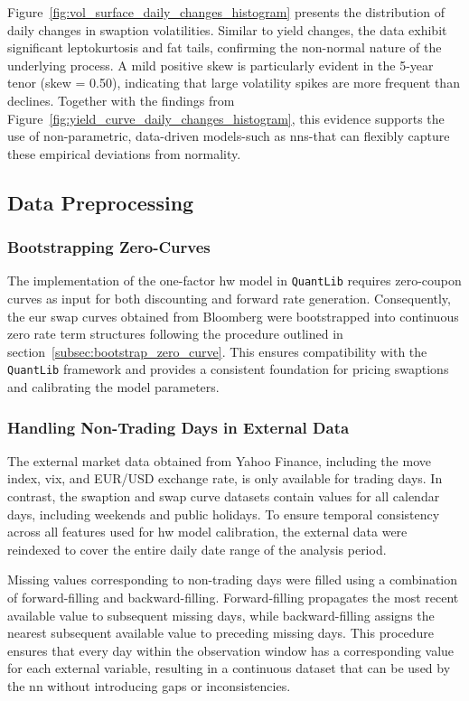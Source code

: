 Figure~\ref{fig:vol_surface_daily_changes_histogram} presents the distribution of daily changes in swaption volatilities. Similar to yield changes, the data exhibit significant leptokurtosis and fat tails, confirming the non-normal nature of the underlying process. A mild positive skew is particularly evident in the 5-year tenor (skew = 0.50), indicating that large volatility spikes are more frequent than declines. Together with the findings from Figure~\ref{fig:yield_curve_daily_changes_histogram}, this evidence supports the use of non-parametric, data-driven models-such as \ac{nn}s-that can flexibly capture these empirical deviations from normality.

\subsection{Data Preprocessing}
\subsubsection{Bootstrapping Zero-Curves}
The implementation of the one-factor \ac{hw} model in \texttt{QuantLib} requires zero-coupon curves as input for both discounting and forward rate generation. Consequently, the \ac{eur} swap curves obtained from Bloomberg were bootstrapped into continuous zero rate term structures following the procedure outlined in section~\ref{subsec:bootstrap_zero_curve}. This ensures compatibility with the \texttt{QuantLib} framework and provides a consistent foundation for pricing swaptions and calibrating the model parameters.

\subsubsection{Handling Non-Trading Days in External Data}
The external market data obtained from Yahoo Finance, including the \ac{move} index, \ac{vix}, and EUR/USD exchange rate, is only available for trading days. In contrast, the swaption and swap curve datasets contain values for all calendar days, including weekends and public holidays. To ensure temporal consistency across all features used for \ac{hw} model calibration, the external data were reindexed to cover the entire daily date range of the analysis period.

Missing values corresponding to non-trading days were filled using a combination of forward-filling and backward-filling. Forward-filling propagates the most recent available value to subsequent missing days, while backward-filling assigns the nearest subsequent available value to preceding missing days. This procedure ensures that every day within the observation window has a corresponding value for each external variable, resulting in a continuous dataset that can be used by the \ac{nn} without introducing gaps or inconsistencies.


